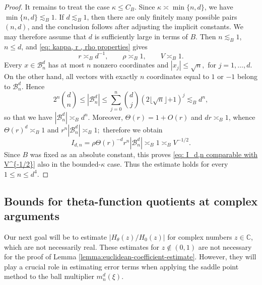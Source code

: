 \documentclass{article}
\newcommand{\C}{\mathbb C}
\theoremstyle{plain}
\numberwithin{equation}{section}
\begin{document}
\begin{proof}
It remains to treat the case $\kappa\leq C_B$. Since
$\kappa\asymp\min\{n,d\}$, we have $\min\{n,d\}\lesssim_B1$.
If $d\lesssim_B1$, then there are only finitely many possible pairs
$(n,d)$, and the conclusion follows after adjusting the implicit
constants. We may therefore assume that $d$ is sufficiently large in
terms of $B$. Then $n\lesssim_B1$, $n\leq d$, and
\eqref{eq: kappa, r , rho properties} gives
\[
 r\asymp_Bd^{-1},\qquad \rho\asymp_B1,\qquad V\asymp_B1.
\]
Every $x\in\mathcal B_n^d$ has at most $n$ nonzero coordinates and
$|x_j|\leq\sqrt n,$ for $j=1,\ldots,d$. On the other hand, all vectors with exactly $n$
coordinates equal to $1$ or $-1$ belong to $\mathcal B_n^d$. Hence
\[
 2^n\binom dn
 \leq|\mathcal B_n^d|
 \leq\sum_{j=0}^n\binom dj(2\lfloor\sqrt n\rfloor{+1})^j
 \lesssim_Bd^n,
\]
so {that we have} $|\mathcal B_n^d|\asymp_Bd^n$. Moreover,
$\Theta(r)=1+O(r)$ and $dr\asymp_B1$, whence
$\Theta(r)^d\asymp_B1$ and $r^n|\mathcal B_n^d|\asymp_B1;$ {therefore we obtain}
\[
 I_{d,n}
 =\rho\Theta(r)^{-d}r^n|\mathcal B_n^d|
 \asymp_B1\asymp_BV^{-1/2}.
\]
Since $B$ was fixed as an absolute constant, this proves
\eqref{eq: I_d,n comparable with V^{-1/2}} also in the bounded-$\kappa$
case. Thus the estimate holds for every $1\leq n\leq d^4$.
\end{proof}

    \subsection{Bounds for theta-function quotients at complex arguments}
    Our next goal will be to estimate $|H_\theta(z)/H_0(z)|$ for complex numbers $z\in\C$, which are not necessarily real. These estimates for $z \not\in (0,1)$ are not necessary for the proof of Lemma \ref{lemma:euclidean-coefficient-estimate}. However, they will play a crucial role in estimating error terms when applying the saddle point method to the ball multiplier $ m_n^d(\xi)$. 
    
\end{document}
